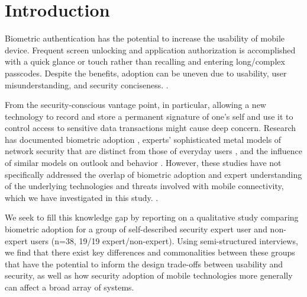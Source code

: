 \section{Introduction}
Biometric authentication has the potential to increase the usability of mobile
device. Frequent screen unlocking and application authorization is accomplished
with a quick glance or touch rather than recalling and entering long/complex
passcodes\cite{mayron2015biometric}. Despite the benefits, adoption can be
uneven due to usability, user misunderstanding, and security conciseness. .

From the security-conscious vantage point, in particular, allowing a new
technology to record and store a permanent signature of one's self and use it to control access to sensitive data transactions might cause deep concern. Research has documented biometric adoption \cite{bhagavatula2015biometric,rashed2015towards}, experts' sophisticated metal models of network security that are distinct from those of everyday users \cite{camp2007experimental,asgharpour2007mental}, and the influence of similar models on outlook and behavior \cite{huh2017don,das2018breaking,kang2015my,stobert2015expert,friedman2002users}. However, these studies have not specifically addressed the overlap of biometric adoption and expert understanding of the underlying
technologies and threats involved with mobile connectivity, which we have  investigated in this study. 
. 

We seek to fill this knowledge gap by reporting on a qualitative study comparing
biometric adoption for a group of self-described security expert user and
non-expert users (n=38, 19/19 expert/non-expert). Using semi-structured
interviews, we find that there exist key differences and commonalities between
these groups that have the potential to inform the design trade-offs between
usability and security, as well as how security adoption of mobile technologies
more generally can affect a broad array of systems.

